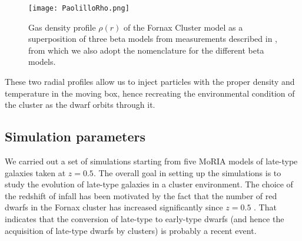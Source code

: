 \begin{figure}[H]
\centering
\texttt{[image: PaolilloRho.png]}
\caption{Gas density profile $\rho(r)$ of the  Fornax Cluster model as a superposition of three beta models from measurements described in \citet{Paolillo2002}, from which we also adopt the nomenclature for the different beta models.
}
\label{fig:profiles}
\end{figure}

These two radial profiles allow us to inject particles with the proper density and temperature in the moving box, hence recreating the environmental condition of the cluster as the dwarf orbits through it.

\subsection{Simulation parameters}
We carried out a set of simulations starting from five MoRIA models of late-type galaxies taken at $z = 0.5$.
The overall goal in setting up the simulations is to study the evolution of late-type galaxies in a cluster environment.
The choice of the redshift of infall has been motivated by the fact that the number of red dwarfs in the Fornax cluster has increased significantly since $z = 0.5$ \citep{Stott2007, DeRijcke2010}.
That indicates that the conversion of late-type to early-type dwarfs (and hence the acquisition of late-type dwarfs by clusters) is probably a recent event.

